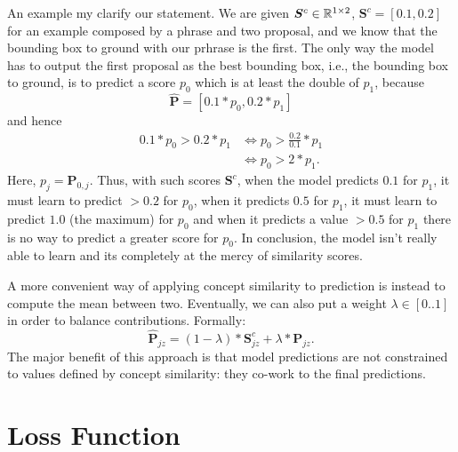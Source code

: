 An example my clarify our statement. We are given $\bm{S}^c \in
\mathbb{R}^{1 \times 2}$, $\bm{S}^c = [0.1, 0.2]$ for an example composed by a
phrase and two proposal, and we know that the bounding box to ground
with our prhrase is the first. The only way the model has to output
the first proposal as the best bounding box, i.e., the bounding box to
ground, is to predict a score $p_{0}$ which is at least the double of
$p_{1}$, because
\begin{equation}
  \bm{\hat{P}} = [0.1 * p_{0}, 0.2 * p_{1}]
\end{equation}
and hence
\begin{equation}
\begin{split}
0.1 * p_{0} > 0.2 * p_{1} & \iff p_{0} >  \frac{0.2}{0.1} * p_{1} \\
  & \iff p_{0} > 2 * p_{1}.
\end{split}
\end{equation}
Here, $p_{j} = \bm{P}_{0,j}$. Thus, with such scores $\bm{S}^c$, when
the model predicts $0.1$ for $p_1$, it must learn to predict $> 0.2$
for $p_0$, when it predicts $0.5$ for $p_1$, it must learn to predict
$1.0$ (the maximum) for $p_0$ and when it predicts a value $> 0.5$ for
$p_1$ there is no way to predict a greater score for $p_0$. In
conclusion, the model isn't really able to learn and its completely at
the mercy of similarity scores.

A more convenient way of applying concept similarity to prediction is
instead to compute the mean between two. Eventually, we can also put a
weight $\lambda \in [0 .. 1]$ in order to balance
contributions. Formally:
\begin{equation}
  \bm{\hat{P}}_{jz} = (1 - \lambda) * \bm{S}^c_{jz} + \lambda * \bm{P}_{jz}.
\end{equation}
The major benefit of this approach is that model predictions are not
constrained to values defined by concept similarity: they co-work to
the final predictions.

\section{Loss Function}
\label{sec:loss}

